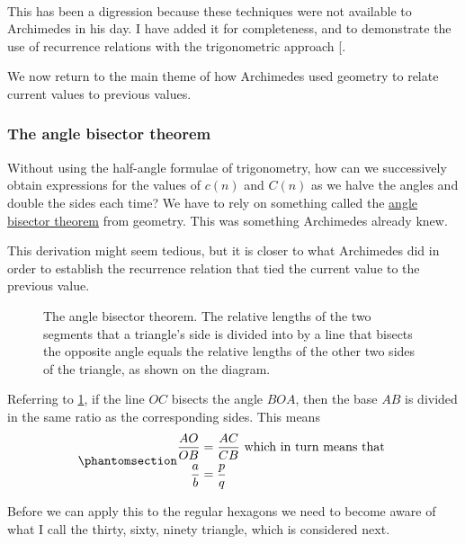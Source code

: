 \documentclass[
  a4paper,
]{article}
\begin{document}
~

This has been a digression because these techniques were not available
to Archimedes in his day. I have added it for completeness, and to
demonstrate the use of recurrence relations with the trigonometric
approach {[}\citeproc{ref-damini-dhar-2020}{2}{]}.

We now return to the main theme of how Archimedes used geometry to
relate current values to previous values.

\subsubsection{The angle bisector
theorem}\label{the-angle-bisector-theorem}

Without using the half-angle formulae of trigonometry, how can we
successively obtain expressions for the values of \(c(n)\) and \(C(n)\)
as we halve the angles and double the sides each time? We have to rely
on something called the
\href{https://en.wikipedia.org/wiki/Angle_bisector_theorem}{angle
bisector theorem} from geometry. This was something Archimedes already
knew.

This derivation might seem tedious, but it is closer to what Archimedes
did in order to establish the recurrence relation that tied the current
value to the previous value.

\begin{figure}
\centering

\caption{The angle bisector theorem. The relative lengths of the two
segments that a triangle's side is divided into by a line that bisects
the opposite angle equals the relative lengths of the other two sides of
the triangle, as shown on the diagram.}\label{fig:angle-bisector}
\end{figure}

Referring to \cref{fig:angle-bisector}, if the line \(OC\) bisects the
angle \(BOA\), then the base \(AB\) is divided in the same ratio as the
corresponding sides. This means
\begin{equation}\phantomsection\label{eq:angle-bisector}{
\begin{aligned}
\frac{AO}{OB} &= \frac{AC}{CB} \mbox{ which in turn means that }\\
\frac{a}{b} &= \frac{p}{q}\\
\end{aligned}
}\end{equation}

Before we can apply this to the regular hexagons we need to become aware
of what I call the thirty, sixty, ninety triangle, which is considered
next.
\end{document}
